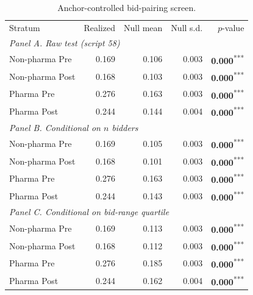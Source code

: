 \begin{table}[!htbp]
\centering
\begin{threeparttable}
\caption{Anchor-controlled bid-pairing screen.}
\label{tab:collusion_screen_anchor}
\small
\setlength{\tabcolsep}{6pt}
\providecommand{\sym}[1]{\textsuperscript{#1}}
\begin{tabular}{lrrrr}
\toprule
Stratum & Realized & Null mean & Null s.d. & $p$-value \\
\multicolumn{5}{l}{\emph{Panel A. Raw test (script 58)}} \\
\midrule
Non-pharma Pre & 0.169 & 0.106 & 0.003 & \textbf{0.000}\sym{***} \\
Non-pharma Post & 0.168 & 0.103 & 0.003 & \textbf{0.000}\sym{***} \\
Pharma Pre & 0.276 & 0.163 & 0.003 & \textbf{0.000}\sym{***} \\
Pharma Post & 0.244 & 0.144 & 0.004 & \textbf{0.000}\sym{***} \\
\multicolumn{5}{l}{\emph{Panel B. Conditional on $n$ bidders}} \\
\midrule
Non-pharma Pre & 0.169 & 0.105 & 0.003 & \textbf{0.000}\sym{***} \\
Non-pharma Post & 0.168 & 0.101 & 0.003 & \textbf{0.000}\sym{***} \\
Pharma Pre & 0.276 & 0.163 & 0.003 & \textbf{0.000}\sym{***} \\
Pharma Post & 0.244 & 0.143 & 0.003 & \textbf{0.000}\sym{***} \\
\multicolumn{5}{l}{\emph{Panel C. Conditional on bid-range quartile}} \\
\midrule
Non-pharma Pre & 0.169 & 0.113 & 0.003 & \textbf{0.000}\sym{***} \\
Non-pharma Post & 0.168 & 0.112 & 0.003 & \textbf{0.000}\sym{***} \\
Pharma Pre & 0.276 & 0.185 & 0.003 & \textbf{0.000}\sym{***} \\
Pharma Post & 0.244 & 0.162 & 0.004 & \textbf{0.000}\sym{***} \\
\bottomrule
\end{tabular}
\begin{tablenotes}[flushleft]\footnotesize

\end{tablenotes}
\end{threeparttable}
\end{table}
